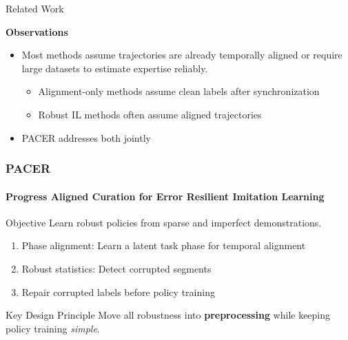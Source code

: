 \documentclass{beamer}
\begin{document}
\begin{frame}{Related Work}

    \small

    \textbf{Observations}
    \begin{itemize}
        \item Most methods assume trajectories are already temporally aligned or require large datasets to estimate expertise reliably.
            \begin{itemize}
                \item Alignment-only methods assume clean labels after synchronization
                \item Robust IL methods often assume aligned trajectories
            \end{itemize}
        \item PACER addresses both jointly
    \end{itemize}

\end{frame}

\begin{frame}
    \frametitle{\textbf{PACER}}
    \framesubtitle{\textbf{P}rogress \textbf{A}ligned \textbf{C}uration for \textbf{E}rror \textbf{R}esilient Imitation Learning}

    \begin{block}{Objective}
        Learn robust policies from sparse and imperfect demonstrations.
    \end{block}

    \vspace{0.75em}

    \begin{enumerate}
        \item Phase alignment: Learn a latent task phase for temporal alignment
        \item Robust statistics: Detect corrupted segments
        \item Repair corrupted labels before policy training
    \end{enumerate}

    \vspace{0.75em}

    \begin{alertblock}{Key Design Principle}
        Move all robustness into \textbf{preprocessing} while keeping policy training \textit{simple}.
    \end{alertblock}
\end{frame}
\end{document}

